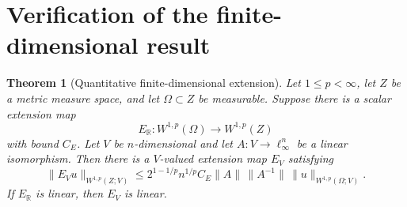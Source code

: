 \documentclass[11pt]{article}
\newtheorem{theorem}{Theorem}[section]
\theoremstyle{remark}
\newcommand{\R}{\mathbb{R}}
\newcommand{\Om}{\Omega}
\newcommand{\Wp}{W^{1,p}}
\begin{document}
\section{Verification of the finite-dimensional result}

\begin{theorem}[Quantitative finite-dimensional extension]
\label{thm:finite}
Let $1\le p<\infty$, let $Z$ be a metric measure space, and let
$\Om\subset Z$ be measurable.  Suppose there is a scalar extension map
\[
  E_{\R}:\Wp(\Om)\longrightarrow \Wp(Z)
\]
with bound $C_E$.  Let $V$ be $n$-dimensional and let
$A:V\to\ell_\infty^n$ be a linear isomorphism.  Then there is a $V$-valued
extension map $E_V$ satisfying
\begin{equation}
\label{eq:finiteconstant}
  \|E_Vu\|_{\Wp(Z;V)}
  \le 2^{1-1/p} n^{1/p} C_E
       \|A\|\,\|A^{-1}\|\,
       \|u\|_{\Wp(\Om;V)}.
\end{equation}
If $E_{\R}$ is linear, then $E_V$ is linear.
\end{theorem}
\end{document}

